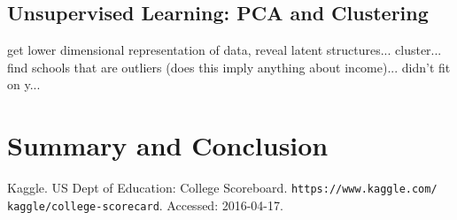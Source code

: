 \documentclass{article} %
\begin{document}
\subsection{Unsupervised Learning: PCA and Clustering}
	get lower dimensional representation of data, reveal latent structures... cluster... find schools that are outliers (does this imply anything about income)... didn't fit on y...
	
\section{Summary and Conclusion}

\begin{thebibliography}{1}

Kaggle.  US Dept of Education: College Scoreboard. \texttt{https://www.kaggle.com/ kaggle/college-scorecard}.  Accessed: 2016-04-17.
\end{thebibliography}
\end{document}

